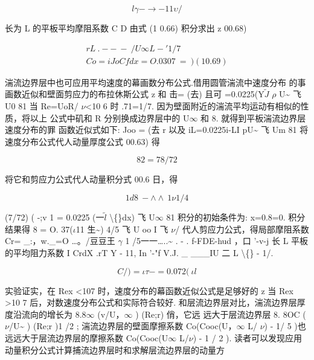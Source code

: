 \[l\gamma -\rightarrow - 11\upsilon /\]

长为 L 的平板平均摩阻系数 C D 由式 (1 0.66) 积分求出 z 00.68)

\begin{gather*}
rL~. - -~-~/U\infty  L   -' 1/ 7\\
Co = iJo Cfdx = O. 0307 ~=~) (1 0.69)
\end{gather*}

湍流边界层中也可应用平均速度的幕画数分布公式.借用圆管湍流中速度分布 的事画数近似和壁面剪应力的布拉休斯公式 z 和 击= (去) 且可 =0.0225(Y$\tilde{J}$ $\rho$ U\textasciitilde{} 飞 U0 81 当 Re=UoR/ $\nu$<10 6 时 .71=1/7. 因为壁面附近的湍流平均运动有相似的性质，将以上 公式中矶和 R 分别换成边界层中的 U$\infty$ 和 8. 就得到平板湍流边界层速度分布的罪 函数近似式如下: Joo = (去 r 以及 iL=0.0225i-LI pU\textasciitilde{} 飞 Um 81 将速度分布公式代人动量厚度公式 00.63) 得

\[82 = 78/72\]

将它和剪应力公式代人动量积分式 00.6 日，得

\[1 d8   ~ -\wedge \wedge ~ 1 \nu    1/4\]

(7/72) ( -;v 1 = 0.0225 (一$\tilde{l}$ \textbackslash\{\}dx) 飞 U$\infty$ 81 积分的初始条件为: x=0.8=0. 积分结果得 8 = O. 37($\iota$11 生\textasciitilde{}) 4/5 飞 U oo I 飞 $\nu$/ 代人剪应力公式，得局部摩阻系数 Cr= \_:，w.\_=O …。/豆豆王 $\gamma$ 1 /5一一…..\textasciitilde{} . - . f-FDE-hud ，口 '-v-j 长 L 平板的平均阻力系数 I CrdX .rT Y - 11, In '-"f V.J. \_ \_\_\_IU 二 L \textbackslash\{\} - 1/.

\[C/) =\iota \tau - = 0.072(~\iota l\]

实验证实，在 Rex <107 时，速度分布的幕函数近似公式是足够好的 z 当 Rex >10 7 后，对数速度分布公式和实际符合较好. 和层流边界层对比，湍流边界层厚度沿流向的增长为 8.8$\infty$ (v/U，$\infty$ ) (Re;r) 俏，它远 远大于层流边界层 8. 8OC ($\nu$/U\textasciitilde{} ) (Re;r )1 /2 ; 湍流边界层的壁面摩擦系数 Co(Cooc(U，$\infty$ L/ $\nu$) - 1/ 5 )也远远大于层流边界层的摩擦系数 Co(Cooc(U$\infty$ L/$\nu$) - 1 / 2 ). 读者可以发现应用动量积分公式计算捕流边界层时和求解层流边界层的动量方

